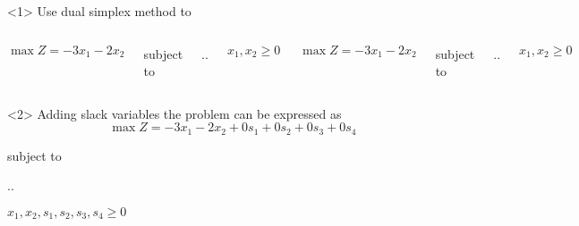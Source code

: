 \begin{frameExample}{\label{example:6.2-2}}{}
  \begin{onlyenv}<1>
    Use dual simplex method to
    \begin{columns}[t]
       \[\max Z = -3x_1 -2x_2 \] 

       {\centering
         subject to%
         \vspace{3mm}
         
        \sysdelim..%

        \vspace{3mm}
        $x_1, x_2 \geq 0$
      \par}
      
    \[\max Z = -3x_1 -2x_2 \]

    {\centering
      subject to
      \vspace{3mm}
      
        \sysdelim..%

        \vspace{3mm}
        $x_1, x_2 \geq 0$
      \par}
    \end{columns}
  \end{onlyenv}

  \begin{onlyenv}<2>
    Adding slack variables the problem can be expressed as \[\max Z = -3x_1 -2x_2 + 0s_1 + 0s_2 + 0s_3 + 0s_4\]

        {\centering
      subject to
      \vspace{3mm}
      
        \sysdelim..%

        \vspace{3mm}
        $x_1, x_2,s_1,s_2,s_3,s_4 \geq 0$
        \par}
      
    \end{onlyenv}


\end{frameExample}
